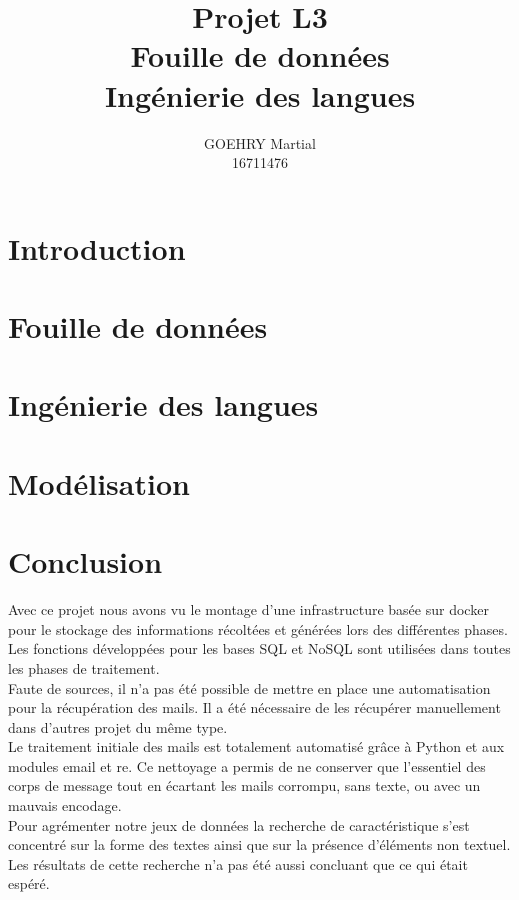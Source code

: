 \documentclass[a4paper,12pt]{article}
\title{Projet L3\\Fouille de données\\Ingénierie des langues}
\author{GOEHRY Martial\\16711476}
\begin{document}
	\maketitle
	\tableofcontents
	\newpage
	
	\section*{Introduction}
		
		\newpage

	\section{Fouille de données}
		\label{sec:fouille-de-donnees}
		
		\newpage
	
	\section{Ingénierie des langues}
		\label{sec:ingenierie-des-langues}
		
		\newpage

	\section{Modélisation}
		\label{sec:modelisation}
		
		\newpage

	\section*{Conclusion}
		\label{sec:Conclusion}
		Avec ce projet nous avons vu le montage d'une infrastructure basée sur docker pour le stockage des informations récoltées et générées lors des différentes phases.
		Les fonctions développées pour les bases SQL et NoSQL sont utilisées dans toutes les phases de traitement.\\

		Faute de sources, il n'a pas été possible de mettre en place une automatisation pour la récupération des mails.
		Il a été nécessaire de les récupérer manuellement dans d'autres projet du même type.\\

		Le traitement initiale des mails est totalement automatisé grâce à Python et aux modules email et re.
		Ce nettoyage a permis de ne conserver que l'essentiel des corps de message tout en écartant les mails corrompu, sans texte, ou avec un mauvais encodage.\\

		Pour agrémenter notre jeux de données la recherche de caractéristique s'est concentré sur la forme des textes ainsi que sur la présence d'éléments non textuel.
		Les résultats de cette recherche n'a pas été aussi concluant que ce qui était espéré.\\
\end{document}
